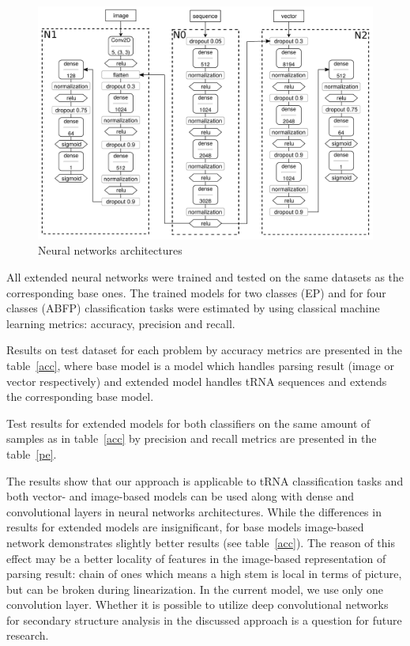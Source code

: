 \documentclass[12pt,a4paper]{cibb}
\begin{document}
\begin{figure}[h]
\begin{center}
\centering
\includegraphics[width=14cm]{nn_arch.pdf}
\caption{Neural networks architectures}
\label{nn}
\end{center}
\end{figure}


All extended neural networks were trained and tested on the same datasets as the corresponding base ones. The trained models for two classes (EP) and for four classes (ABFP) classification tasks were estimated by using classical machine learning metrics: accuracy, precision and recall.

Results on test dataset for each problem by accuracy metrics are presented in the table~\ref{acc}, where base model is a model which handles parsing result (image or vector respectively) and extended model handles tRNA sequences and extends the corresponding base model.



Test results for extended models for both classifiers on the same amount of samples as in table~\ref{acc} by precision and recall metrics are presented in the table~\ref{pe}.



The results show that our approach is applicable to tRNA classification tasks and both vector- and image-based models can be used along with dense and convolutional layers in neural networks architectures.
While the differences in results for extended models are insignificant, for base models image-based network demonstrates slightly better results (see table~\ref{acc}).
The reason of this effect may be a better locality of features in the image-based representation of parsing result: chain of ones which means a high stem is local in terms of picture, but can be broken during linearization.
In the current model, we use only one convolution layer.
Whether it is possible to utilize deep convolutional networks for secondary structure analysis in the discussed approach is a question for future research.
\end{document}
